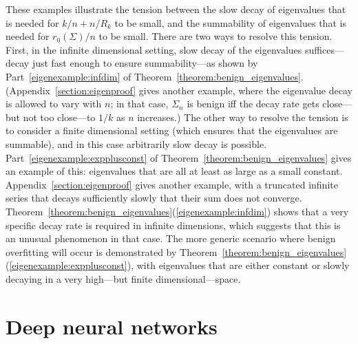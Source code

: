 \documentclass[11pt,notitlepage]{article}
\begin{document}
These examples illustrate the tension between the slow decay
of eigenvalues that is needed for $k/n+n/R_k$ to be
small, and the summability of eigenvalues that is needed for
$r_0(\Sigma)/n$ to be small. There are two ways to resolve this tension. 
First, in the infinite dimensional setting, slow decay of the
eigenvalues suffices---decay just fast enough to ensure
summability---as shown by Part~\ref{eigenexample:infdim} of
Theorem~\ref{theorem:benign_eigenvalues}.
(Appendix~\ref{section:eigenproof}
gives another example, where the eigenvalue decay is allowed
to vary with $n$; in that case, $\Sigma_n$ is benign iff the decay
rate gets close---but not too close---to $1/k$ as $n$ increases.)
The other way to resolve the tension is to consider
a finite dimensional setting (which ensures that the eigenvalues
are summable), and in this case arbitrarily slow decay is possible.
Part~\ref{eigenexample:expplusconst} of
Theorem~\ref{theorem:benign_eigenvalues} gives an example of this:
eigenvalues that are all at least as large as a small constant.
Appendix~\ref{section:eigenproof}
gives another example, with a truncated infinite
series that decays sufficiently slowly that their sum
does not converge.
Theorem~\ref{theorem:benign_eigenvalues}(\ref{eigenexample:infdim})
shows that a very specific decay rate is required in infinite
dimensions, which suggests that this is an unusual phenomenon in that
case. The more generic scenario where benign overfitting will occur is
demonstrated by
Theorem~\ref{theorem:benign_eigenvalues}(\ref{eigenexample:expplusconst}),
with eigenvalues that are either constant or slowly decaying in a very
high---but finite dimensional---space.

\section{Deep neural networks}\label{section:deepnets}
\end{document}
